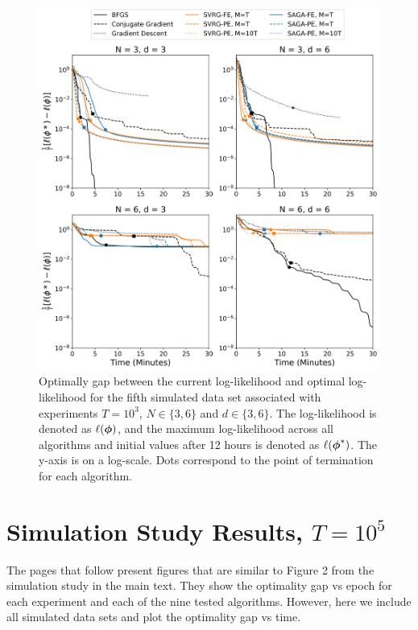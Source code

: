 \documentclass[12pt]{article}
\begin{document}
\begin{figure}[H]
    \centering
    \includegraphics[width=6.5in]{../plt/log-like_v_time_T-1000-004.png}
    \caption{Optimally gap between the current log-likelihood and optimal log-likelihood for the fifth simulated data set associated with experiments $T=10^{3}$, $N \in \{3,6\}$ and $d \in \{3,6\}$. The log-likelihood is denoted as $\ell(\boldsymbol{\phi})$, and the maximum log-likelihood across all algorithms and initial values after 12 hours is denoted as $\ell(\boldsymbol{\phi}^*)$. The y-axis is on a log-scale. Dots correspond to the point of termination for each algorithm.}
\end{figure}

\newpage

\section{Simulation Study Results, $T = 10^{5}$}

The pages that follow present figures that are similar to Figure 2 from the simulation study in the main text. They show the optimality gap vs epoch for each experiment and each of the nine tested algorithms. However, here we include all simulated data sets and plot the optimality gap vs time.
\end{document}

